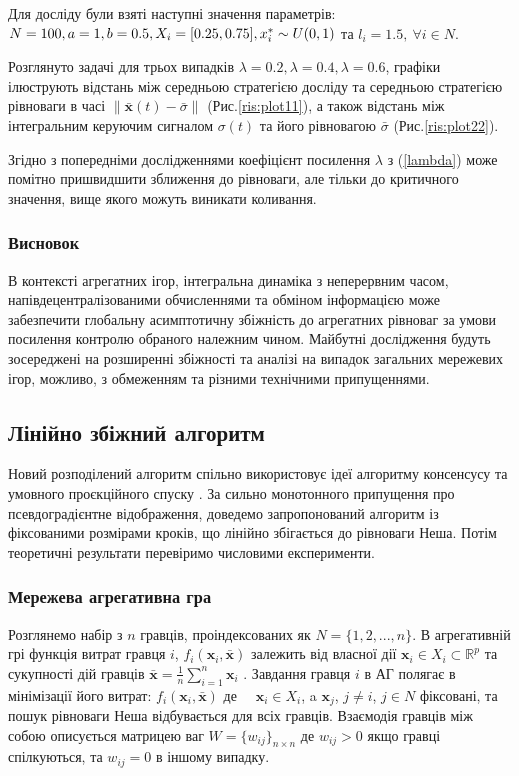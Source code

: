 \documentclass[a4paper]{article}
\begin{document}
Для досліду були взяті наступні значення параметрів: $N=100, a=1,\\ b=0.5, X_i=[0.25, 0.75], x_i^* \sim U(0,1)$ та $l_i = 1.5, ~\forall i\in N$.

Розглянуто задачі для трьох випадків $\lambda=0.2, \lambda=0.4, \lambda=0.6$, графіки ілюструють відстань між середньою стратегією досліду та середньою стратегією рівноваги в часі $\|\mathbf{\bar{x}}(t) - \bar{\sigma}\|$ (Рис.\ref{ris:plot11}), а також відстань між інтегральним керуючим сигналом $\sigma(t)$ та його рівновагою $\bar{\sigma}$ (Рис.\ref{ris:plot22}).

Згідно з попередніми дослідженнями коефіцієнт посилення $\lambda$ з (\ref{lambda}) може помітно пришвидшити зближення до рівноваги, але тільки до критичного значення, вище якого можуть виникати коливання.
\subsubsection*{Висновок}
В контексті агрегатних ігор, інтегральна динаміка з неперервним часом, напівдецентралізованими обчисленнями та обміном інформацією може забезпечити глобальну асимптотичну збіжність до агрегатних рівноваг за умови посилення контролю обраного належним чином. Майбутні дослідження будуть зосереджені на розширенні збіжності та аналізі на випадок загальних мережевих ігор, можливо, з обмеженням та різними технічними припущеннями.

\clearpage
\subsection{Лінійно збіжний алгоритм \cite{Article2}}
Новий розподілений алгоритм спільно використовує ідеї алгоритму консенсусу та умовного проєкційного спуску \cite{Cite1}. За сильно монотонного припущення про псевдоградієнтне відображення, доведемо запропонований алгоритм із фіксованими розмірами кроків, що лінійно збігається до рівноваги Неша. Потім теоретичні результати перевіримо числовими експерименти.

\subsubsection*{Мережева агрегативна гра}
Розглянемо набір з $n$ гравців, проіндексованих як $N = \{1, 2, ... , n\}$.
В агрегативній грі функція витрат гравця $i$, $f_i (\mathbf{x}_i
, \mathbf{\bar{x}})$ залежить від власної дії $\mathbf{x}_i \in X_i \subset \mathbb{R}^p$ та сукупності дій гравців $\mathbf{\bar{x}} = \frac{1}{n} \sum_{i=1}^{n} \mathbf{x}_i$ . Завдання гравця $i$ в АГ полягає в мінімізації його витрат: $f_i (\mathbf{x}_i, \mathbf{\bar{x}})$ де $\quad\mathbf{x}_i \in X_i$, a $ \mathbf{x}_j$, $j \neq i$, $j \in N$ фіксовані, та пошук рівноваги Неша відбувається для всіх гравців.
Взаємодія гравців між собою описується матрицею ваг $W = \{w_{ij}\}_{n\times n}$ де $w_{ij} > 0$ якщо гравці спілкуються, та $w_{ij} = 0$ в іншому випадку.
\end{document}

